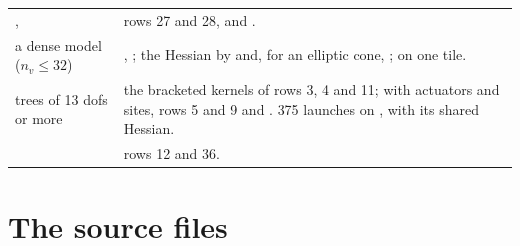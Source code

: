 \begin{longtable}{@{}L{36mm}L{120mm}@{}}
,  & rows 27 and 28,  and . \\
a dense model ($n_v \le 32$) & , ; the Hessian by  and, for an elliptic cone, ;  on one tile. \\
trees of 13 dofs or more & the bracketed kernels of rows 3, 4 and 11; with actuators and sites, rows 5 and 9 and . 375 launches on , with its shared Hessian. \\
 & rows 12 and 36. \\
\bottomrule
\end{longtable}
\endgroup

\section{The source files}\label{sec:files}

